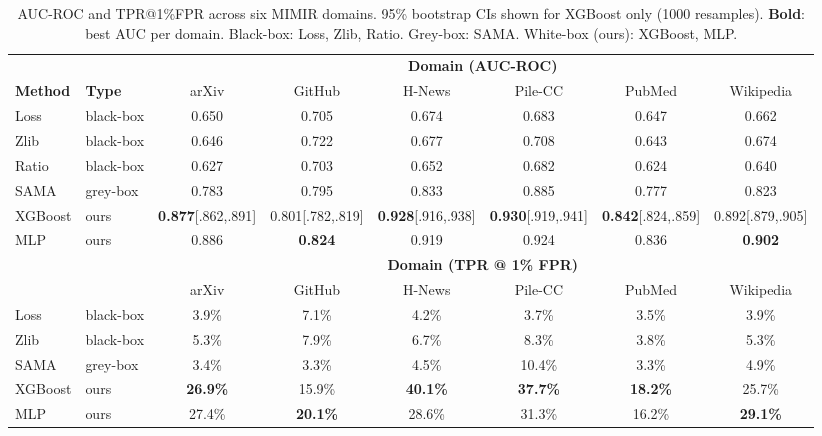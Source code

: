 \begin{table}[t]
\centering
\caption{AUC-ROC and TPR@1\%FPR across six MIMIR domains.
         95\% bootstrap CIs shown for XGBoost only (1000 resamples).
         \textbf{Bold}: best AUC per domain.
         Black-box: Loss, Zlib, Ratio. Grey-box: SAMA. White-box (ours): XGBoost, MLP.}
\label{tab:main}
\small
\setlength{\tabcolsep}{4.5pt}
\begin{tabular}{l l cccccc}
\toprule
& & \multicolumn{6}{c}{\textbf{Domain (AUC-ROC)}} \\
\cmidrule(lr){3-8}
\textbf{Method} & \textbf{Type} & arXiv & GitHub & H-News & Pile-CC & PubMed & Wikipedia \\
\midrule
Loss    & black-box & 0.650 & 0.705 & 0.674 & 0.683 & 0.647 & 0.662 \\
Zlib    & black-box & 0.646 & 0.722 & 0.677 & 0.708 & 0.643 & 0.674 \\
Ratio   & black-box & 0.627 & 0.703 & 0.652 & 0.682 & 0.624 & 0.640 \\
SAMA    & grey-box  & 0.783 & 0.795 & 0.833 & 0.885 & 0.777 & 0.823 \\
\midrule
XGBoost & ours & \textbf{0.877}{\tiny[.862,.891]} & 0.801{\tiny[.782,.819]} & \textbf{0.928}{\tiny[.916,.938]} & \textbf{0.930}{\tiny[.919,.941]} & \textbf{0.842}{\tiny[.824,.859]} & 0.892{\tiny[.879,.905]} \\
MLP     & ours & 0.886 & \textbf{0.824} & 0.919 & 0.924 & 0.836 & \textbf{0.902} \\
\midrule
& & \multicolumn{6}{c}{\textbf{Domain (TPR @ 1\% FPR)}} \\
\cmidrule(lr){3-8}
& & arXiv & GitHub & H-News & Pile-CC & PubMed & Wikipedia \\
\midrule
Loss    & black-box & 3.9\% & 7.1\% & 4.2\% & 3.7\% & 3.5\% & 3.9\% \\
Zlib    & black-box & 5.3\% & 7.9\% & 6.7\% & 8.3\% & 3.8\% & 5.3\% \\
SAMA    & grey-box  & 3.4\% & 3.3\% & 4.5\% & 10.4\% & 3.3\% & 4.9\% \\
XGBoost & ours & \textbf{26.9\%} & 15.9\% & \textbf{40.1\%} & \textbf{37.7\%} & \textbf{18.2\%} & 25.7\% \\
MLP     & ours & 27.4\% & \textbf{20.1\%} & 28.6\% & 31.3\% & 16.2\% & \textbf{29.1\%} \\
\bottomrule
\end{tabular}
\end{table}
